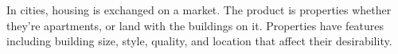 In cities, housing is exchanged on a market. The product is properties %
whether they're apartments, or land with the buildings on it. Properties have features including building size, style, quality, and location %
that affect their desirability. %





